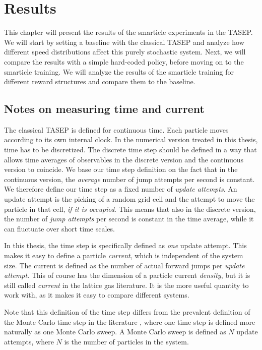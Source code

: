 \graphicspath{{img/results}{img/results/out}}

\chapter{Results}
\label{ch:results}
This chapter will present the results of the smarticle experiments in the TASEP. We will start by setting a baseline with the classical TASEP and analyze how different speed distributions affect this purely stochastic system. Next, we will compare the results with a simple hard-coded policy, before moving on to the smarticle training. We will analyze the results of the smarticle training for different reward structures and compare them to the baseline. 

\section{Notes on measuring time and current}
\label{sec:time_current}
The classical TASEP is defined for continuous time. Each particle moves according to its own internal clock. In the numerical version treated in this thesis, time has to be discretized. The discrete time step should be defined in a way that allows time averages of observables in the discrete version and the continuous version to coincide. We base our time step definition on the fact that in the continuous version, the \textit{average} number of jump attempts per second is constant. We therefore define our time step as a fixed number of \textit{update attempts}. An update attempt is the picking of a random grid cell and the attempt to move the particle in that cell, \textit{if it is occupied}. This means that also in the discrete version, the number of \textit{jump attempts} per second is constant in the time average, while it can fluctuate over short time scales.


In this thesis, the time step is specifically defined as \textit{one} update attempt. This makes it easy to define a particle \textit{current}, which is independent of the system size. The current is defined as the number of actual forward jumps per \textit{update attempt}. This of course has the dimension of a particle current \textit{density}, but it is still called \textit{current} in the lattice gas literature. It is the more useful quantity to work with, as it makes it easy to compare different systems. 


Note that this definition of the time step differs from the prevalent definition of the Monte Carlo time step in the literature \cite[ch. 3.2]{daquila_monte_nodate}, where one time step is defined more naturally as one Monte Carlo sweep. A Monte Carlo sweep is defined as $N$ update attempts, where $N$ is the number of particles in the system. 

